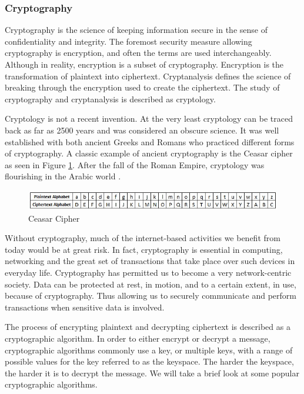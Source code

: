 \subsubsection{Cryptography}
Cryptography is the science of keeping information secure in the sense of confidentiality and integrity. The foremost security measure allowing cryptography is encryption, and often the terms are used interchangeably. Although in reality, encryption is a subset of cryptography. Encryption is the transformation of plaintext into ciphertext. Cryptanalysis defines the science of breaking through the encryption used to create the ciphertext. The study of cryptography and cryptanalysis is described as cryptology.

Cryptology is not a recent invention. At the very least cryptology can be traced back as far as 2500 years and was considered an obscure science. It was well established with both ancient Greeks and Romans who practiced different forms of cryptography. A classic example of ancient cryptography is the Ceasar cipher as seen in Figure \ref{fig:ceasar-cipher}. After the fall of the Roman Empire, cryptology was flourishing in the Arabic world \cite{dooley2018history}.

\begin{figure}[!h]
    \includegraphics[width=\textwidth]{../../img/chapter_2/ceasar-cipher.jpg}
    \caption{Ceasar Cipher}\label{fig:ceasar-cipher}
\end{figure}

Without cryptography, much of the internet-based activities we benefit from today would be at great risk. In fact, cryptography is essential in computing, networking and the great set of transactions that take place over such devices in everyday life. Cryptography has permitted us to become a very network-centric society. 
Data can be protected at rest, in motion, and to a certain extent, in use, because of cryptography. Thus allowing us to securely communicate and perform transactions when sensitive data is involved.

The process of encrypting plaintext and decrypting ciphertext is described as a cryptographic algorithm. In order to either encrypt or decrypt a message, cryptographic algorithms commonly use a key, or multiple keys, with a range of possible values for the key referred to as the keyspace. The harder the keyspace, the harder it is to decrypt the message. We will take a brief look at some popular cryptographic algorithms.

